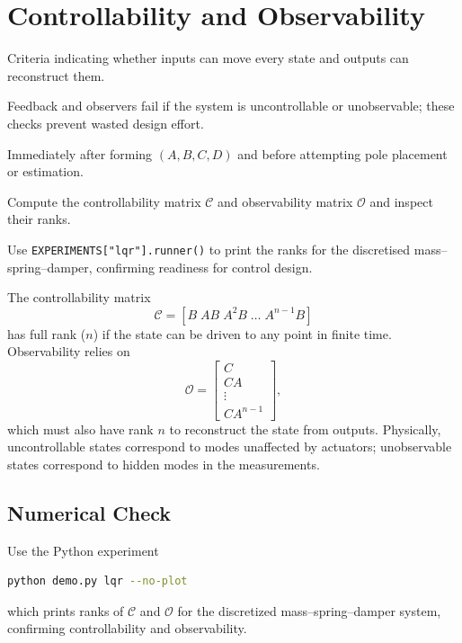 \section{Controllability and Observability}
\begin{beginnerguide}
    \item[\textbf{What?}] Criteria indicating whether inputs can move every state and outputs can reconstruct them.
    \item[\textbf{Why?}] Feedback and observers fail if the system is uncontrollable or unobservable; these checks prevent wasted design effort.
    \item[\textbf{When?}] Immediately after forming $(A,B,C,D)$ and before attempting pole placement or estimation.
    \item[\textbf{How?}] Compute the controllability matrix $\mathcal{C}$ and observability matrix $\mathcal{O}$ and inspect their ranks.
    \item[\textbf{Example}] Use \texttt{EXPERIMENTS["lqr"].runner()} to print the ranks for the discretised mass--spring--damper, confirming readiness for control design.
\end{beginnerguide}
The controllability matrix
\begin{equation}
    \mathcal{C} = [B\; AB\; A^2 B\; \dots\; A^{n-1} B]
\end{equation}
has full rank ($n$) if the state can be driven to any point in finite time. Observability relies on
\begin{equation}
    \mathcal{O} = \begin{bmatrix} C \\ C A \\ \vdots \\ C A^{n-1} \end{bmatrix},
\end{equation}
which must also have rank $n$ to reconstruct the state from outputs. Physically, uncontrollable states correspond to modes unaffected by actuators; unobservable states correspond to hidden modes in the measurements.

\subsection{Numerical Check}
Use the Python experiment
\begin{lstlisting}[language=bash]
python demo.py lqr --no-plot
\end{lstlisting}
which prints ranks of $\mathcal{C}$ and $\mathcal{O}$ for the discretized mass--spring--damper system, confirming controllability and observability.

